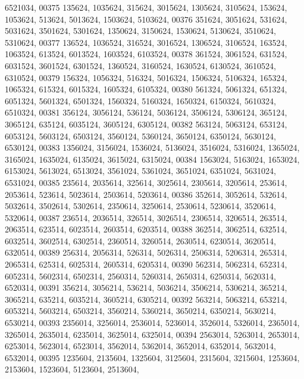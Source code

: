\begin{DoxyCode}
      6521034,
00375        135624, 1035624,  315624, 3015624, 1305624, 3105624,  153624, 1053624,  513624, 5013624, 1503624, 
      5103624,
00376        351624, 3051624,  531624, 5031624, 3501624, 5301624, 1350624, 3150624, 1530624, 5130624, 3510624, 
      5310624,
00377        136524, 1036524,  316524, 3016524, 1306524, 3106524,  163524, 1063524,  613524, 6013524, 1603524, 
      6103524,
00378        361524, 3061524,  631524, 6031524, 3601524, 6301524, 1360524, 3160524, 1630524, 6130524, 3610524, 
      6310524,
00379        156324, 1056324,  516324, 5016324, 1506324, 5106324,  165324, 1065324,  615324, 6015324, 1605324, 
      6105324,
00380        561324, 5061324,  651324, 6051324, 5601324, 6501324, 1560324, 5160324, 1650324, 6150324, 5610324, 
      6510324,
00381        356124, 3056124,  536124, 5036124, 3506124, 5306124,  365124, 3065124,  635124, 6035124, 3605124, 
      6305124,
00382        563124, 5063124,  653124, 6053124, 5603124, 6503124, 3560124, 5360124, 3650124, 6350124, 5630124, 
      6530124,
00383       1356024, 3156024, 1536024, 5136024, 3516024, 5316024, 1365024, 3165024, 1635024, 6135024, 3615024, 
      6315024,
00384       1563024, 5163024, 1653024, 6153024, 5613024, 6513024, 3561024, 5361024, 3651024, 6351024, 5631024, 
      6531024,
00385        235614, 2035614,  325614, 3025614, 2305614, 3205614,  253614, 2053614,  523614, 5023614, 2503614, 
      5203614,
00386        352614, 3052614,  532614, 5032614, 3502614, 5302614, 2350614, 3250614, 2530614, 5230614, 3520614, 
      5320614,
00387        236514, 2036514,  326514, 3026514, 2306514, 3206514,  263514, 2063514,  623514, 6023514, 2603514, 
      6203514,
00388        362514, 3062514,  632514, 6032514, 3602514, 6302514, 2360514, 3260514, 2630514, 6230514, 3620514, 
      6320514,
00389        256314, 2056314,  526314, 5026314, 2506314, 5206314,  265314, 2065314,  625314, 6025314, 2605314, 
      6205314,
00390        562314, 5062314,  652314, 6052314, 5602314, 6502314, 2560314, 5260314, 2650314, 6250314, 5620314, 
      6520314,
00391        356214, 3056214,  536214, 5036214, 3506214, 5306214,  365214, 3065214,  635214, 6035214, 3605214, 
      6305214,
00392        563214, 5063214,  653214, 6053214, 5603214, 6503214, 3560214, 5360214, 3650214, 6350214, 5630214, 
      6530214,
00393       2356014, 3256014, 2536014, 5236014, 3526014, 5326014, 2365014, 3265014, 2635014, 6235014, 3625014, 
      6325014,
00394       2563014, 5263014, 2653014, 6253014, 5623014, 6523014, 3562014, 5362014, 3652014, 6352014, 5632014, 
      6532014,
00395       1235604, 2135604, 1325604, 3125604, 2315604, 3215604, 1253604, 2153604, 1523604, 5123604, 2513604, 

\end{DoxyCode}
